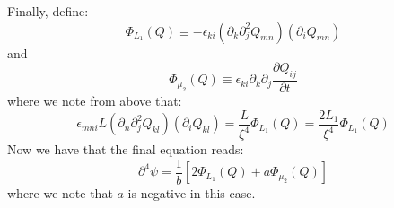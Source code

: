 \documentclass[reqno]{article}
\begin{document}
Finally, define:
\begin{equation}
	\Phi_{L_1} (Q) \equiv -\epsilon_{ki} \left( \partial_k \partial_j^2 Q_{mn} \right)
	\left( \partial_i Q_{mn} \right)
\end{equation}
and
\begin{equation}
	\Phi_{\mu_2} (Q) \equiv \epsilon_{ki} \partial_k \partial_j \frac{\partial Q_{ij}}{\partial t}
\end{equation}
where we note from above that:
\begin{equation}
	\epsilon_{mni} L \left( \partial_n \partial_j^2 Q_{kl}\right)
	\left( \partial_i Q_{kl} \right)
	= \frac{L}{\xi^4} \Phi_{L_1} (Q)
	= \frac{2 L_1}{\xi^4} \Phi_{L_1} (Q)
\end{equation}
Now we have that the final equation reads:
\begin{equation}
	\partial^4 \psi = \frac{1}{b} \left[
	2 \Phi_{L_1} (Q) + a \Phi_{\mu_2} (Q)
	\right]
\end{equation}
where we note that $a$ is negative in this case.
\end{document}
